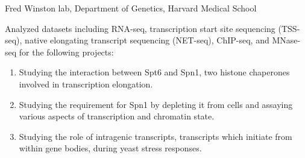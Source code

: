 \documentclass[11pt, a4paper]{article}
\begin{document}
\begin{description}[topsep=2pt, align=right, leftmargin=!, labelwidth=\widthof{\textbf{2019-20}}]
    \item [2019-20] Fred Winston lab, Department of Genetics, Harvard Medical School

                      Analyzed datasets including RNA-seq, transcription start site sequencing (TSS-seq), native elongating transcript sequencing (NET-seq), ChIP-seq, and MNase-seq for the following projects:
                      \begin{enumerate}
                          \item Studying the interaction between Spt6 and Spn1, two histone chaperones involved in transcription elongation.
                          \item Studying the requirement for Spn1 by depleting it from cells and assaying various aspects of transcription and chromatin state.
                          \item Studying the role of intragenic transcripts, transcripts which initiate from within gene bodies, during yeast stress responses.
                      \end{enumerate}
\end{description}
\end{document}
